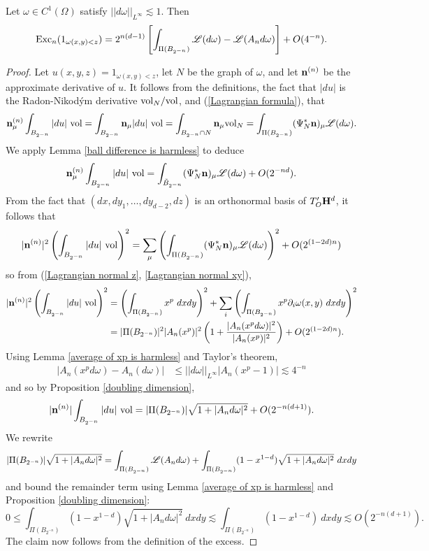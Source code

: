 \begin{lemma}\label{excess vs plateau energy}
Let $\omega \in C^1(\Omega)$ satisfy $||d\omega||_{L^\infty} \lesssim 1$. Then
\begin{align*}
    \operatorname{Exc}_n(1_{\omega(x, y) < z}) = 2^{n(d - 1)} \left[\int_{\Pi(B_{2^{-n}})} \mathscr L(d\omega) - \mathscr L(A_n d\omega)\right] + O(4^{-n}).
\end{align*}
\end{lemma}
\begin{proof}
Let $u(x, y, z) = 1_{\omega(x, y) < z}$, let $N$ be the graph of $\omega$, and let $\mathbf n^{(n)}$ be the approximate derivative of $u$.
It follows from the definitions, the fact that $|du|$ is the Radon-Nikod\'ym derivative $\mathrm{vol}_N/\mathrm{vol}$, and (\ref{Lagrangian formula}), that
$$\mathbf n^{(n)}_\mu \int_{B_{2^{-n}}} |du| ~\mathrm{vol} = \int_{B_{2^{-n}}} \mathbf n_\mu |du| ~\mathrm{vol} = \int_{B_{2^{-n}} \cap N} \mathbf n_\mu \mathrm{vol}_N = \int_{\Pi(B_{2^{-n}})} (\Psi_N^* \mathbf n)_\mu \mathscr L(d\omega).$$
We apply Lemma \ref{ball difference is harmless} to deduce
$$\mathbf n^{(n)}_\mu \int_{B_{2^{-n}}} |du| ~\mathrm{vol} = \int_{\tilde B_{2^{-n}}} (\Psi_N^* \mathbf n)_\mu \mathscr L(d\omega) + O(2^{-nd}).$$
From the fact that $(dx, dy_1, \dots, dy_{d - 2}, dz)$ is an orthonormal basis of $T_O' \mathbf H^d$, it follows that
$$|\mathbf n^{(n)}|^2 \left(\int_{B_{2^{-n}}} |du| ~\mathrm{vol}\right)^2 = \sum_\mu \left(\int_{\Pi(B_{2^{-n}})} (\Psi_N^* \mathbf n)_\mu \mathscr L(d\omega)\right)^2 + O(2^{(1 - 2d)n})$$
so from (\ref{Lagrangian normal z}, \ref{Lagrangian normal xy}),
\begin{align*}
    |\mathbf n^{(n)}|^2 \left(\int_{B_{2^{-n}}} |du| ~\mathrm{vol}\right)^2 &= \left(\int_{\Pi(B_{2^{-n}})} x^p ~dxdy\right)^2 + \sum_i \left(\int_{\Pi(B_{2^{-n}})} x^p \partial_i \omega(x, y) ~dxdy \right)^2 \\
    &= |\Pi(B_{2^{-n}})|^2 |A_n (x^p)|^2 \left(1 + \frac{|A_n(x^p d\omega)|^2}{|A_n (x^p)|^2}\right) + O(2^{(1 - 2d)n}).
\end{align*}
Using Lemma \ref{average of xp is harmless} and Taylor's theorem,
\begin{align*}
    |A_n(x^p d\omega) - A_n (d\omega)| &\leq ||d\omega||_{L^\infty} |A_n (x^p - 1)| \lesssim 4^{-n}
\end{align*}
and so by Proposition \ref{doubling dimension},
$$|\mathbf n^{(n)}| \int_{B_{2^{-n}}} |du| ~\mathrm{vol} = |\Pi(B_{2^{-n}})| \sqrt{1 + |A_n d\omega|^2} + O(2^{-n(d + 1)}).$$
We rewrite
$$|\Pi(B_{2^{-n}})| \sqrt{1 + |A_n d\omega|^2} = \int_{\Pi(B_{2^{-n}})} \mathscr L(A_nd\omega) + \int_{\Pi(B_{2^{-n}})} (1 - x^{1 - d})\sqrt{1 + |A_n d\omega|^2} ~dxdy$$
and bound the remainder term using Lemma \ref{average of xp is harmless} and Proposition \ref{doubling dimension}:
$$0 \leq \int_{\Pi(B_{2^{-n}})} (1 - x^{1 - d})\sqrt{1 + |A_n d\omega|^2} ~dxdy \lesssim \int_{\Pi(B_{2^{-n}})} (1 - x^{1-d}) ~dxdy \lesssim O(2^{-n(d + 1)}).$$
The claim now follows from the definition of the excess.
\end{proof}

